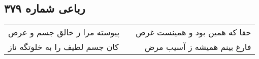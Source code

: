 \begin{center}
\section*{رباعی شماره ۳۷۹}
\label{sec:sh379}
\begin{longtable}{l p{0.5cm} r}
پیوسته مرا ز خالق جسم و عرض
&&
حقا که همین بود و همینست غرض
\\
کان جسم لطیف را به خلوتگه ناز
&&
فارغ بینم همیشه ز آسیب مرض
\\
\end{longtable}
\end{center}
